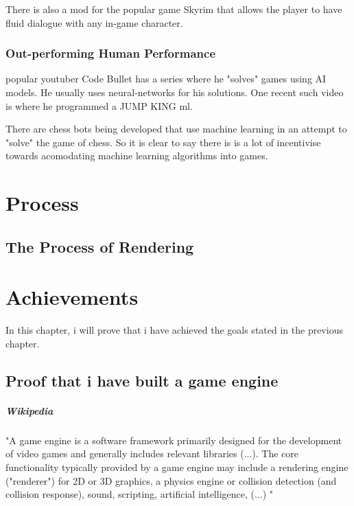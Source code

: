                 There is also a mod for the popular game Skyrim that allows the player to have fluid dialogue with any in-game character. 
        
        \subsection{Out-performing Human Performance}
            popular youtuber Code Bullet has a series where he "solves" games using AI models. He usually uses neural-networks for his solutions. One recent such video is where he programmed a JUMP KING ml.
            
            There are chess bots being developed that use machine learning in an attempt to "solve" the game of chess. So it is clear to say there is is a lot of incentivise towards acomodating machine learning algorithms into games.





\chapter{Process}
    \section{The Process of Rendering}



\chapter{Achievements}

    In this chapter, i will prove that i have achieved the goals stated in the previous chapter.

    \section{Proof that i have built a game engine}
        \paragraph*{Wikipedia} "A game engine is a software framework primarily designed for the development of video games and generally includes relevant libraries
        (...).
        The core functionality typically provided by a game engine may include a rendering engine ("renderer") for 2D or 3D graphics, a physics engine or collision detection (and collision response), sound, scripting, artificial intelligence, 
        (...)
        "

